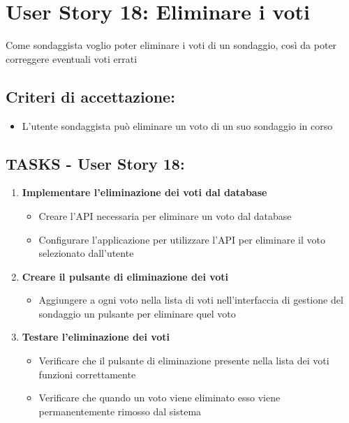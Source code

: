 \section*{User Story 18: Eliminare i voti}
    Come sondaggista voglio poter eliminare i voti di un sondaggio, così da poter correggere eventuali voti errati
    \subsection*{Criteri di accettazione:}  
    \begin{itemize}  
        \item L'utente sondaggista può eliminare un voto di un suo sondaggio in corso
    \end{itemize}  
    \subsection*{TASKS - User Story 18:}  
    \begin{enumerate}  
        \item \textbf{Implementare l'eliminazione dei voti dal database}  
            \begin{itemize}  
                \item Creare l'API necessaria per eliminare un voto dal database
                \item Configurare l'applicazione per utilizzare l'API per eliminare il voto selezionato dall'utente
            \end{itemize} 
        \item \textbf{Creare il pulsante di eliminazione dei voti}  
            \begin{itemize}  
                \item Aggiungere a ogni voto nella lista di voti nell'interfaccia di gestione del sondaggio un pulsante per eliminare quel voto
            \end{itemize}
        \item \textbf{Testare l'eliminazione dei voti}  
            \begin{itemize}  
                \item Verificare che il pulsante di eliminazione presente nella lista dei voti funzioni correttamente
                \item Verificare che quando un voto viene eliminato esso viene permanentemente rimosso dal sistema
            \end{itemize} 
    \end{enumerate}
